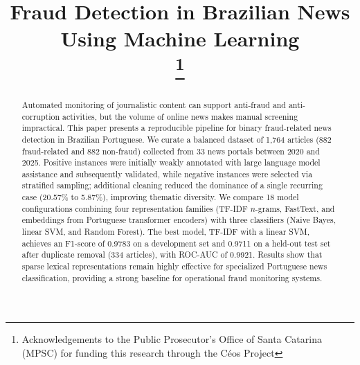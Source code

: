 \documentclass[conference]{IEEEtran}
\begin{document}
\title{Fraud Detection in Brazilian News Using Machine Learning\\
\thanks{Acknowledgements to the Public Prosecutor's Office of Santa Catarina (MPSC) for funding this research through the Céos Project}
}

\author{
\and
{}
}

\maketitle

\begin{abstract}

Automated monitoring of journalistic content can support anti-fraud and anti-corruption activities, but the volume of online news makes manual screening impractical. This paper presents a reproducible pipeline for binary fraud-related news detection in Brazilian Portuguese. We curate a balanced dataset of 1,764 articles (882 fraud-related and 882 non-fraud) collected from 33 news portals between 2020 and 2025. Positive instances were initially weakly annotated with large language model assistance and subsequently validated, while negative instances were selected via stratified sampling; additional cleaning reduced the dominance of a single recurring case (20.57\% to 5.87\%), improving thematic diversity. We compare 18 model configurations combining four representation families (TF-IDF $n$-grams, FastText, and embeddings from Portuguese transformer encoders) with three classifiers (Naive Bayes, linear SVM, and Random Forest). The best model, TF-IDF with a linear SVM, achieves an F1-score of 0.9783 on a development set and 0.9711 on a held-out test set after duplicate removal (334 articles), with ROC-AUC of 0.9921. Results show that sparse lexical representations remain highly effective for specialized Portuguese news classification, providing a strong baseline for operational fraud monitoring systems.

\end{abstract}
\end{document}
